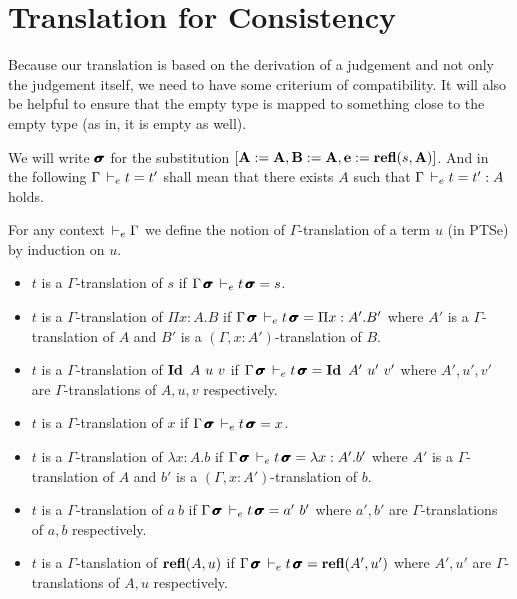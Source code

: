 \documentclass[a4paper,english]{lipics-utf8x}
\begin{document}
  \section{Translation for Consistency}

  Because our translation is based on the derivation of a judgement and not
  only the judgement itself, we need to have some criterium of compatibility.
  It will also be helpful to ensure that the empty type is mapped to something
  close to the empty type (as in, it is empty as well).

  We will write $\operatorname{\pmb{\bm{\sigma}}}$ for the substitution
  $[\operatorname{\mathbf{A}} := \operatorname{\mathbf{A}}, \operatorname{\mathbf{B}} := \operatorname{\mathbf{A}}, \operatorname{\mathbf{e}} := \operatorname{\mathbf{refl}}(s,\operatorname{\mathbf{A}})]$.
  And in the following $\Gamma \,\vdash_e t = t'$ shall mean that there exists $A$
  such that $\Gamma \,\vdash_e t = t' : A$ holds.

  \begin{definition}
    For any context $\,\vdash_e \Gamma$ we define the notion of $\Gamma$-translation
    of a term $u$ (in PTSe) by induction on $u$.
    \begin{itemize}
      \item $t$ is a $\Gamma$-translation of $s$ if
            $\Gamma \operatorname{\pmb{\bm{\sigma}}} \,\vdash_e t \operatorname{\pmb{\bm{\sigma}}} = s$.
      \item $t$ is a $\Gamma$-translation of $\Pi x:A.B$ if
            $\Gamma \operatorname{\pmb{\bm{\sigma}}} \,\vdash_e t \operatorname{\pmb{\bm{\sigma}}} = \Pi x:A'.B'$ where $A'$ is a
            $\Gamma$-translation of $A$ and $B'$ is a
            $(\Gamma, x:A')$-translation of $B$.
      \item $t$ is a $\Gamma$-translation of $\operatorname{\mathbf{Id}~} A\ u\ v$ if
            $\Gamma \msigma \dere t \msigma = \Id A'\ u'\ v'$ where $A',u',v'$
            are $\Gamma$-translations of $A,u,v$ respectively.
      \item $t$ is a $\Gamma$-translation of $x$ if
            $\Gamma \operatorname{\pmb{\bm{\sigma}}} \,\vdash_e t \operatorname{\pmb{\bm{\sigma}}} = x$.
      \item $t$ is a $\Gamma$-translation of $\lambda x:A.b$ if
            $\Gamma \operatorname{\pmb{\bm{\sigma}}} \,\vdash_e t \operatorname{\pmb{\bm{\sigma}}} = \lambda x:A'.b'$ where $A'$ is a
            $\Gamma$-translation of $A$ and $b'$ is a
            $(\Gamma, x:A')$-translation of $b$.
      \item $t$ is a $\Gamma$-translation of $a\ b$ if
            $\Gamma \msigma \dere t \msigma = a'\ b'$ where $a',b'$ are
            $\Gamma$-translations of $a,b$ respectively.
      \item $t$ is a $\Gamma$-tanslation of $\operatorname{\mathbf{refl}}(A,u)$ if
            $\Gamma \operatorname{\pmb{\bm{\sigma}}} \,\vdash_e t \operatorname{\pmb{\bm{\sigma}}} = \operatorname{\mathbf{refl}}(A',u')$ where $A',u'$ are
            $\Gamma$-translations of $A,u$ respectively.

\end{itemize}
\end{definition}
\end{document}
